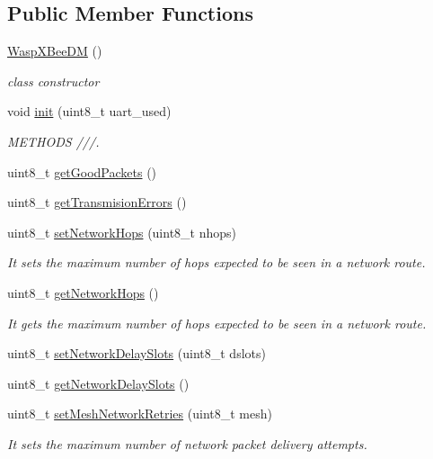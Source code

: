 \subsection*{Public Member Functions}
\begin{DoxyCompactItemize}
\item 
\hyperlink{class_wasp_x_bee_d_m_a4ff0350f301fb2d04a61ee73f474410d}{Wasp\+X\+Bee\+DM} ()
\begin{DoxyCompactList}\small\item\em class constructor \end{DoxyCompactList}\item 
void \hyperlink{class_wasp_x_bee_d_m_af24064ddd73b0c86201d36a693d6f19f}{init} (uint8\+\_\+t uart\+\_\+used)
\begin{DoxyCompactList}\small\item\em M\+E\+T\+H\+O\+DS ///. \end{DoxyCompactList}\item 
uint8\+\_\+t \hyperlink{class_wasp_x_bee_d_m_a14cefccd876ebb9507d587592aaf917c}{get\+Good\+Packets} ()
\item 
uint8\+\_\+t \hyperlink{class_wasp_x_bee_d_m_ac9b4531bd42bb795ea6bafbd5b3539ed}{get\+Transmision\+Errors} ()
\item 
uint8\+\_\+t \hyperlink{class_wasp_x_bee_d_m_a6da2114d35dbd0b1f38ec7ef54ec6fa4}{set\+Network\+Hops} (uint8\+\_\+t nhops)
\begin{DoxyCompactList}\small\item\em It sets the maximum number of hops expected to be seen in a network route. \end{DoxyCompactList}\item 
uint8\+\_\+t \hyperlink{class_wasp_x_bee_d_m_ac3cb784bc6019c1fd71d3c393864919d}{get\+Network\+Hops} ()
\begin{DoxyCompactList}\small\item\em It gets the maximum number of hops expected to be seen in a network route. \end{DoxyCompactList}\item 
uint8\+\_\+t \hyperlink{class_wasp_x_bee_d_m_a577e4af1c745dfc032a5b043ee3870df}{set\+Network\+Delay\+Slots} (uint8\+\_\+t dslots)
\item 
uint8\+\_\+t \hyperlink{class_wasp_x_bee_d_m_a2996157f3a44c29970715548f559830c}{get\+Network\+Delay\+Slots} ()
\item 
uint8\+\_\+t \hyperlink{class_wasp_x_bee_d_m_ab7d3ed990ff47dffa94233215a816304}{set\+Mesh\+Network\+Retries} (uint8\+\_\+t mesh)
\begin{DoxyCompactList}\small\item\em It sets the maximum number of network packet delivery attempts. \end{DoxyCompactList}\item 

\end{DoxyCompactItemize}
